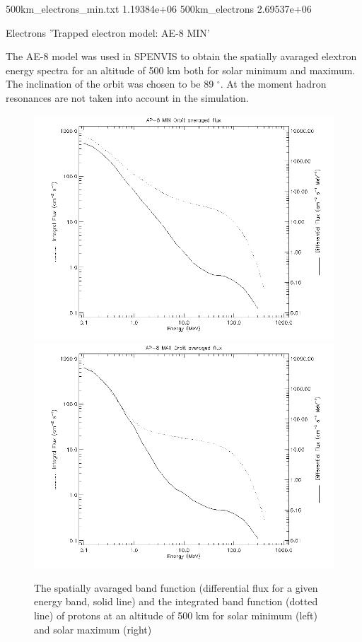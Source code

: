 \documentclass[12pt, a4paper,titlepage]{article}
\numberwithin{equation}{section}
\numberwithin{figure}{section}
\begin{document}
500km\_electrons\_min.txt
1.19384e+06
500km\_electrons  2.69537e+06

Electrons
'Trapped electron model: AE-8 MIN'

The AE-8 model was used in SPENVIS to obtain the spatially avaraged elextron energy spectra for an altitude of 500 km both for solar minimum and maximum. The inclination of the orbit was chosen to be 89 $^{\circ}$. At the moment hadron resonances are not taken into account in the simulation.

\begin{figure}[htbp]
 \centering %
 \includegraphics[width=.45\textwidth,origin=c,angle=0]{images/alt_500km_AP-8_MIN_averaged_spectra.png}
 \qquad
 \includegraphics[width=.45\textwidth,origin=c]{images/alt_500km_AP-8_MAX_averaged_spectra.png} 
 \caption{\label{fig:band500p} The spatially avaraged band function (differential flux for a given energy band, solid line) and the integrated band function (dotted line) of protons at an altitude of 500 km for solar minimum (left) and solar maximum (right) }
 \end{figure}
\end{document}
